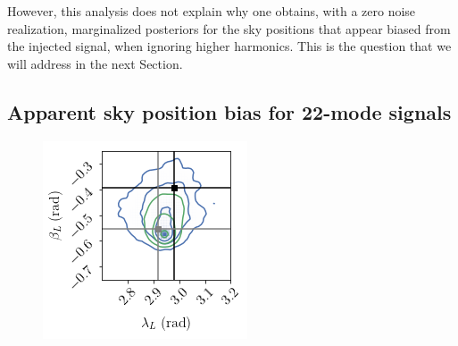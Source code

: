 \documentclass[aps,showpacs,twocolumn,prd,superscriptaddress,nofootinbib]{revtex4-1}
\begin{document}
However, this analysis does not explain why one obtains, with a zero noise realization, marginalized posteriors for the sky positions that appear biased from the injected signal, when ignoring higher harmonics. This is the question that we will address in the next Section.


\subsection{Apparent sky position bias for 22-mode signals}
\label{subsec:MBHBPEdegen22}

\begin{figure}
  \centering
  \begin{minipage}{.49\linewidth}
  \includegraphics[width=.99\linewidth]{corner_skydown_smbh_case9_22_ptmcmc_bambi_withdegen.png}
  \end{minipage}
  \begin{minipage}{.49\linewidth}

\end{minipage}
\end{figure}
\end{document}
